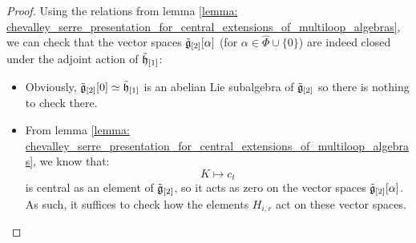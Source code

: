             \begin{proof}
                Using the relations from lemma \ref{lemma: chevalley_serre_presentation_for_central_extensions_of_multiloop_algebras}, we can check that the vector spaces $\tilde{\mathfrak{g}}_{[2]}[\alpha]$ (for $\alpha \in \hat{\Phi} \cup \{0\}$) are indeed closed under the adjoint action of $\tilde{\mathfrak{h}}_{[1]}$:
                \begin{itemize}
                    \item Obviously, $\tilde{\mathfrak{g}}_{[2]}[0] \simeq \tilde{\mathfrak{h}}_{[1]}$ is an abelian Lie subalgebra of $\tilde{\mathfrak{g}}_{[2]}$ so there is nothing to check there. 
                    \item From lemma \ref{lemma: chevalley_serre_presentation_for_central_extensions_of_multiloop_algebras}, we know that:
                        $$K \mapsto c_t$$
                    is central as an element of $\tilde{\mathfrak{g}}_{[2]}$, so it acts as zero on the vector spaces $\tilde{\mathfrak{g}}_{[2]}[\alpha]$. As such, it suffices to check how the elements $H_{i, r}$ act on these vector spaces. 
                    

\end{itemize}
\end{proof}
